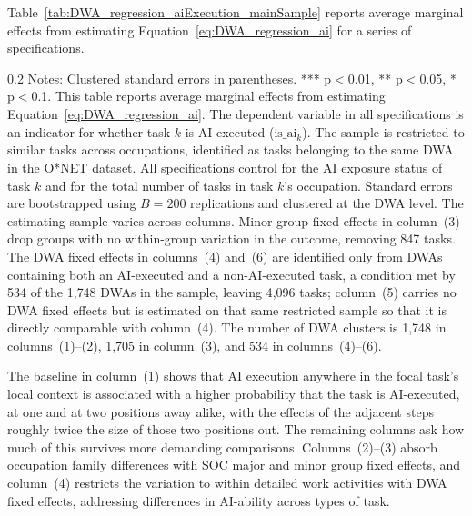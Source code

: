 Table~\ref{tab:DWA_regression_aiExecution_mainSample} reports average marginal effects from estimating Equation~\eqref{eq:DWA_regression_ai} for a series of specifications.
\begin{table}[!t]
\centering
\caption{Neighboring Tasks' AI Execution Status and a Task's AI Execution}
\label{tab:DWA_regression_aiExecution_mainSample}
    \footnotesize
\resizebox{\textwidth}{!}{

}
\begin{minipage}{1\linewidth}
\begin{spacing}{0.2}
{\fontsize{9.5pt}{10pt}\selectfont Notes: Clustered standard errors in parentheses. *** p$<$0.01, ** p$<$0.05, * p$<$0.1.
This table reports average marginal effects from estimating Equation~\eqref{eq:DWA_regression_ai}.
The dependent variable in all specifications is an indicator for whether task $k$ is AI-executed ($\text{is\_ai}_{k}$).
The sample is restricted to similar tasks across occupations, identified as tasks belonging to the same DWA in the O*NET dataset.
All specifications control for the AI exposure status of task $k$ and for the total number of tasks in task $k$'s occupation.
Standard errors are bootstrapped using $B=200$ replications and clustered at the DWA level.
The estimating sample varies across columns. Minor-group fixed effects in column~(3) drop groups with no within-group variation in the outcome, removing 847 tasks. The DWA fixed effects in columns~(4) and~(6) are identified only from DWAs containing both an AI-executed and a non-AI-executed task, a condition met by 534 of the 1{,}748 DWAs in the sample, leaving 4{,}096 tasks; column~(5) carries no DWA fixed effects but is estimated on that same restricted sample so that it is directly comparable with column~(4). The number of DWA clusters is 1{,}748 in columns~(1)--(2), 1{,}705 in column~(3), and 534 in columns~(4)--(6).}
\end{spacing}
\end{minipage}\end{table}
The baseline in column~(1) shows that AI execution anywhere in the focal task's local context is associated with a higher probability that the task is AI-executed, at one and at two positions away alike, with the effects of the adjacent steps roughly twice the size of those two positions out.
The remaining columns ask how much of this survives more demanding comparisons.
Columns~(2)--(3) absorb occupation family differences with SOC major and minor group fixed effects, and column~(4) restricts the variation to within detailed work activities with DWA fixed effects, addressing differences in AI-ability across types of task.
